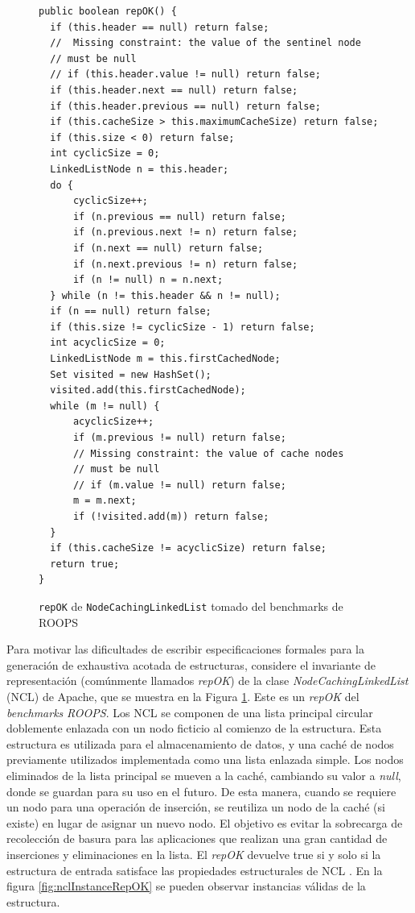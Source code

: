 \begin{figure}[!thb]
\begin{lstlisting}
public boolean repOK() {
  if (this.header == null) return false;
  //  Missing constraint: the value of the sentinel node
  // must be null  
  // if (this.header.value != null) return false;
  if (this.header.next == null) return false;
  if (this.header.previous == null) return false;
  if (this.cacheSize > this.maximumCacheSize) return false;
  if (this.size < 0) return false;
  int cyclicSize = 0;
  LinkedListNode n = this.header;
  do {
      cyclicSize++;
      if (n.previous == null) return false;
      if (n.previous.next != n) return false;
      if (n.next == null) return false;
      if (n.next.previous != n) return false;
      if (n != null) n = n.next;
  } while (n != this.header && n != null);
  if (n == null) return false;
  if (this.size != cyclicSize - 1) return false;
  int acyclicSize = 0;
  LinkedListNode m = this.firstCachedNode;
  Set visited = new HashSet();
  visited.add(this.firstCachedNode);
  while (m != null) {
      acyclicSize++;
      if (m.previous != null) return false;
      // Missing constraint: the value of cache nodes
      // must be null
      // if (m.value != null) return false;
      m = m.next;
      if (!visited.add(m)) return false;
  }
  if (this.cacheSize != acyclicSize) return false;
  return true;
}
\end{lstlisting}
\caption{\texttt{repOK} de \texttt{NodeCachingLinkedList} tomado del benchmarks de \textsf{ROOPS}}
\label{fig:NCL-repOK}
\end{figure}

Para motivar las dificultades de escribir especificaciones formales para la generación de exhaustiva acotada de  estructuras, considere el invariante de representación (comúnmente llamados \emph{repOK}) de la clase \emph{NodeCachingLinkedList} (NCL) de Apache, que se muestra en la Figura \ref{fig:NCL-repOK}. Este es un \emph{repOK} del \emph{benchmarks} \emph{ROOPS}. Los NCL se componen de una lista principal circular doblemente enlazada con un nodo ficticio al comienzo de la estructura. Esta estructura es utilizada para el almacenamiento de datos, y una caché de nodos previamente utilizados implementada como una lista enlazada simple. Los nodos eliminados de la lista principal se mueven a la caché, cambiando su valor a \emph{null}, donde se guardan para su uso en el futuro. De esta manera, cuando se requiere un nodo para una operación de inserción, se reutiliza un nodo de la caché (si existe) en lugar de asignar un nuevo nodo. El objetivo es evitar la sobrecarga de recolección de basura para las aplicaciones que realizan una gran cantidad de inserciones y eliminaciones en la lista. El \emph{repOK} devuelve true si y solo si la estructura de entrada satisface las propiedades estructurales de NCL \cite{Liskov00}. En la figura \ref{fig:nclInstanceRepOK} se pueden observar instancias válidas de la estructura.

